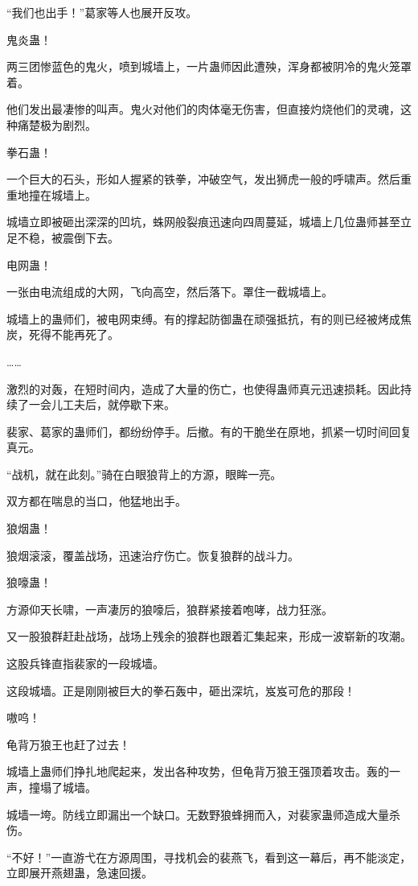 \begin{this_body}
“我们也出手！”葛家等人也展开反攻。

鬼炎蛊！

两三团惨蓝色的鬼火，喷到城墙上，一片蛊师因此遭殃，浑身都被阴冷的鬼火笼罩着。

他们发出最凄惨的叫声。鬼火对他们的肉体毫无伤害，但直接灼烧他们的灵魂，这种痛楚极为剧烈。

拳石蛊！

一个巨大的石头，形如人握紧的铁拳，冲破空气，发出狮虎一般的呼啸声。然后重重地撞在城墙上。

城墙立即被砸出深深的凹坑，蛛网般裂痕迅速向四周蔓延，城墙上几位蛊师甚至立足不稳，被震倒下去。

电网蛊！

一张由电流组成的大网，飞向高空，然后落下。罩住一截城墙上。

城墙上的蛊师们，被电网束缚。有的撑起防御蛊在顽强抵抗，有的则已经被烤成焦炭，死得不能再死了。

……

激烈的对轰，在短时间内，造成了大量的伤亡，也使得蛊师真元迅速损耗。因此持续了一会儿工夫后，就停歇下来。

裴家、葛家的蛊师们，都纷纷停手。后撤。有的干脆坐在原地，抓紧一切时间回复真元。

“战机，就在此刻。”骑在白眼狼背上的方源，眼眸一亮。

双方都在喘息的当口，他猛地出手。

狼烟蛊！

狼烟滚滚，覆盖战场，迅速治疗伤亡。恢复狼群的战斗力。

狼嚎蛊！

方源仰天长啸，一声凄厉的狼嚎后，狼群紧接着咆哮，战力狂涨。

又一股狼群赶赴战场，战场上残余的狼群也跟着汇集起来，形成一波崭新的攻潮。

这股兵锋直指裴家的一段城墙。

这段城墙。正是刚刚被巨大的拳石轰中，砸出深坑，岌岌可危的那段！

嗷呜！

龟背万狼王也赶了过去！

城墙上蛊师们挣扎地爬起来，发出各种攻势，但龟背万狼王强顶着攻击。轰的一声，撞塌了城墙。

城墙一垮。防线立即漏出一个缺口。无数野狼蜂拥而入，对裴家蛊师造成大量杀伤。

“不好！”一直游弋在方源周围，寻找机会的裴燕飞，看到这一幕后，再不能淡定，立即展开燕翅蛊，急速回援。


\end{this_body}
